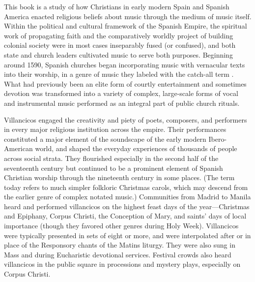 This book is a study of how Christians in early modern Spain and Spanish
America enacted religious beliefs about music through the medium of music
itself.
Within the political and cultural framework of the Spanish Empire, the
spiritual work of propagating faith and the comparatively worldly project of
building colonial society were in most cases inseparably fused (or confused),
and both state and church leaders cultivated music to serve both purposes.
Beginning around 1590, Spanish churches began incorporating music with
vernacular texts into their worship, in a genre of music they labeled with the
catch-all term .
What had previously been an elite form of courtly entertainment and sometimes
devotion was transformed into a variety of complex, large-scale forms of vocal
and instrumental music performed as an integral part of public church rituals.

Villancicos engaged the creativity and piety of poets, composers, and
performers in every major religious institution across the empire.
Their performances constituted a major element of the soundscape of the early
modern Ibero-American world, and shaped the everyday experiences of thousands
of people across social strata.
They flourished especially in the second half of the seventeenth century but
continued to be a prominent element of Spanish Christian worship through the
nineteenth century in some places.
(The term today refers to much simpler folkloric Christmas carols, which may
descend from the earlier genre of complex notated music.)
Communities from Madrid to Manila heard and performed villancicos on the
highest feast days of the year---Christmas and Epiphany, Corpus Christi, the
Conception of Mary, and saints' days of local importance (though they
favored other genres during Holy Week).
Villancicos were typically presented in sets of eight or more, and were
interpolated after or in place of the Responsory chants of the Matins liturgy.
They were also sung in Mass and during Eucharistic devotional services.
Festival crowds also heard villancicos in the public square in processions and
mystery plays, especially on Corpus Christi.

